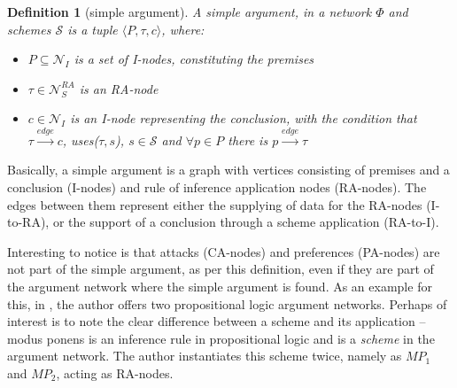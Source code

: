 \documentclass[12pt, a4paper]{article}
\newtheorem{Def}{Definition}[subsection]
\begin{document}
\begin{Def}[simple argument]\label{defsarg}
\sloppy A simple argument, in a network $\Phi$ and schemes $\mathcal{S}$ is a tuple $\langle P, \tau, c \rangle$, where:
\begin{itemize}
    \item $P \subseteq \mathcal{N}_I$ is a set of I-nodes, constituting the premises
    \item $\tau \in \mathcal{N}_S^{RA}$ is an \emph{RA-node}
    \item $c \in \mathcal{N}_I$ is an I-node representing the conclusion, with the condition that $\tau \xrightarrow{edge} c$, uses($\tau, s$), $s \in \mathcal{S}$ and $\forall p \in P$ there is $p \xrightarrow{edge} \tau$
\end{itemize}
\end{Def}
Basically, a simple argument is a graph with vertices consisting of premises and a conclusion (I-nodes) and rule of inference application nodes (RA-nodes). The edges between them represent either the supplying of data for the RA-nodes (I-to-RA), or the support of a conclusion through a scheme application (RA-to-I).

Interesting to notice is that attacks (CA-nodes) and preferences (PA-nodes) are not part of the simple argument, as per this definition, even if they are part of the argument network where the simple argument is found. As an example for this, in \cite[Figure 5.6]{weiss}, the author offers two propositional logic argument networks. Perhaps of interest is to note the clear difference between a scheme and its application -- modus ponens is an inference rule in propositional logic and is a \emph{scheme} in the argument network. The author instantiates this scheme twice, namely as $MP_1$ and $MP_2$, acting as RA-nodes.
\end{document}
